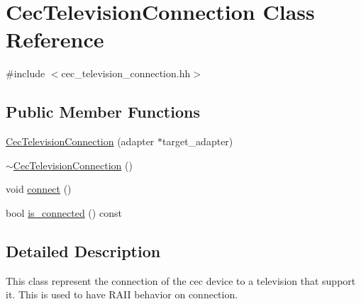 \hypertarget{classCecTelevisionConnection}{\section{Cec\+Television\+Connection Class Reference}
\label{classCecTelevisionConnection}
}


{\ttfamily \#include $<$cec\+\_\+television\+\_\+connection.\+hh$>$}

\subsection*{Public Member Functions}
\begin{DoxyCompactItemize}
\item 
\hyperlink{classCecTelevisionConnection_a3e57a0de618e90a6feca673524fc0d64}{Cec\+Television\+Connection} (adapter $\ast$target\+\_\+adapter)
\item 
\hyperlink{classCecTelevisionConnection_a0688605f07e4d9dd3ed4fad854b41579}{$\sim$\+Cec\+Television\+Connection} ()
\item 
void \hyperlink{classCecTelevisionConnection_ab8ff59b20f9bbccfdfa47af33ca0055e}{connect} ()
\item 
bool \hyperlink{classCecTelevisionConnection_a4b9798dfad2902b9dd462f9a929db6b5}{is\+\_\+connected} () const 
\end{DoxyCompactItemize}


\subsection{Detailed Description}
This class represent the connection of the cec device to a television that support it. This is used to have R\+A\+I\+I behavior on connection. 

